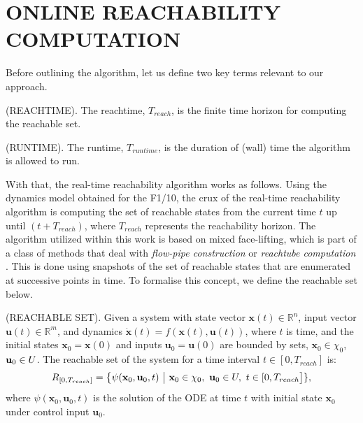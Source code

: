 \documentclass[manuscript,screen,review]{acmart}
\begin{document}
\section{ONLINE REACHABILITY COMPUTATION}

Before outlining the algorithm, let us define two key terms relevant to our approach.\smallskip

\begin{definition}%
(REACHTIME). The reachtime, $T_{reach}$, is the finite time horizon for computing the reachable set.
\end{definition}%
\begin{definition}%
(RUNTIME). The runtime, $T_{runtime}$, is the duration of (wall) time the algorithm is allowed to run.
\end{definition}%

With that, the real-time reachability algorithm works as follows. Using the dynamics model obtained for the F1/10, the crux of the real-time reachability algorithm is computing the set of reachable states from the current time $t$ up until $(t+T_{reach})$, where $T_{reach}$ represents the reachability horizon. The algorithm utilized within this work is based on mixed face-lifting, which is part of a class of methods that deal with \textit{flow-pipe construction} or \textit{reachtube computation} \cite{Johnson2016}. This is done using snapshots of the set of reachable states that are enumerated at successive points in time. To formalise this concept, we define the reachable set below.

\smallskip
\begin{definition}%
(REACHABLE SET). Given a system with state vector $\textbf{x}(t) \in \mathbb{R}^n$, input vector $\textbf{u}(t) \in \mathbb{R}^m$, and dynamics $\dot{\textbf{x}}(t)=f(\textbf{x}(t),\textbf{u}(t))$, where $t$ is time, and the initial states $\textbf{x}_0 = \textbf{x}(0)$ and inputs $\textbf{u}_0 = \textbf{u}(0)$ are bounded by sets, $\textbf{x}_0 \in \chi_0$, $\textbf{u}_0 \in \mathnormal{U}$. The reachable set of the system for a time interval $ t \in [0,T_{reach}]$ is:%
%
\begin{equation*}%
    \mathnormal{R}_{[0,T_{reach}]} = \big \{ \psi(\textbf{x}_0,\textbf{u}_0,t) \ \big| \ \textbf{x}_0 \in \chi_0, \ \textbf{u}_0 \in \mathnormal{U}, \ t \in [0,T_{reach}\big]\},%
\end{equation*}%
%
\noindent where $\psi(\textbf{x}_0,\textbf{u}_0,t)$ is the solution of the ODE at time $t$ with initial state $\textbf{x}_0$ under control input $\textbf{u}_0$.
\end{definition}%
\smallskip
\end{document}

